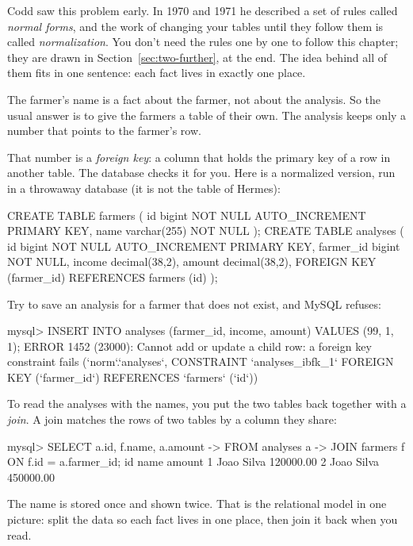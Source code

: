 Codd saw this problem early. In 1970 and 1971 he described a set of rules
called \emph{normal forms}, and the work of changing your tables until they
follow them is called \emph{normalization}. You don't need the rules one by
one to follow this chapter; they are drawn in Section~\ref{sec:two-further},
at the end. The idea behind all of them fits in one sentence: each fact lives
in exactly one place.

The farmer's name is a fact about the farmer, not about the analysis. So the
usual answer is to give the farmers a table of their own. The analysis keeps
only a number that points to the farmer's row.

That number is a \emph{foreign key}: a column that holds the primary key of a
row in another table. The database checks it for you. Here is a normalized
version, run in a throwaway database (it is not the table of Hermes):

\begin{code}[language=SQL]
CREATE TABLE farmers (
  id   bigint NOT NULL AUTO_INCREMENT PRIMARY KEY,
  name varchar(255) NOT NULL
);
CREATE TABLE analyses (
  id        bigint NOT NULL AUTO_INCREMENT PRIMARY KEY,
  farmer_id bigint NOT NULL,
  income    decimal(38,2),
  amount    decimal(38,2),
  FOREIGN KEY (farmer_id) REFERENCES farmers (id)
);
\end{code}

Try to save an analysis for a farmer that does not exist, and MySQL refuses:

\begin{terminal}
mysql> INSERT INTO analyses (farmer_id, income, amount) VALUES (99, 1, 1);
ERROR 1452 (23000): Cannot add or update a child row: a foreign key
constraint fails (`norm`.`analyses`, CONSTRAINT `analyses_ibfk_1`
FOREIGN KEY (`farmer_id`) REFERENCES `farmers` (`id`))
\end{terminal}

To read the analyses with the names, you put the two tables back together
with a \emph{join}. A join matches the rows of two tables by a column they
share:

\begin{terminal}
mysql> SELECT a.id, f.name, a.amount
    -> FROM analyses a
    -> JOIN farmers f ON f.id = a.farmer_id;
id  name        amount
1   Joao Silva  120000.00
2   Joao Silva  450000.00
\end{terminal}

The name is stored once and shown twice. That is the relational model in
one picture: split the data so each fact lives in one place, then join it
back when you read.

